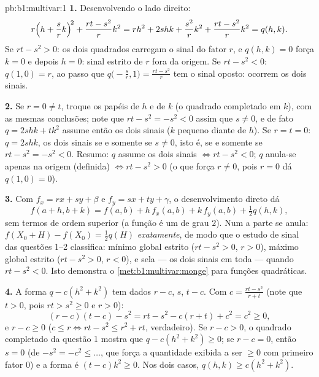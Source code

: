 \begin{solution}{pb:b1:multivar:1}
\textbf{1.} Desenvolvendo o lado direito:
\[
r\Bigl(h + \frac srk\Bigr)^{\!2} + \frac{rt - s^2}{r}k^2
= rh^2 + 2shk + \frac{s^2}{r}k^2 + \frac{rt - s^2}{r}k^2
= q(h,k) .
\]
Se $rt - s^2 > 0$: os dois quadrados carregam o sinal do fator $r$, e $q(h,k) = 0$
força $k = 0$ e depois $h = 0$: sinal estrito de $r$ fora da origem.
Se $rt - s^2 < 0$: $q(1, 0) = r$, ao passo que $q\bigl(-\frac sr, 1\bigr) = \frac{rt - s^2}{r}$ tem o sinal oposto: ocorrem os
dois sinais.

\textbf{2.} Se $r = 0 \neq t$, troque os papéis de $h$ e de $k$ (o quadrado
completado em $k$), com as mesmas conclusões; note que $rt - s^2 = -s^2 < 0$ assim
que $s \neq 0$, e de fato $q =
2shk + tk^2$ assume então os dois sinais ($k$ pequeno
diante de $h$). Se $r = t = 0$: $q = 2shk$, os dois sinais se e somente se
$s \neq 0$, isto é, se e somente se $rt - s^2 = -s^2 < 0$. Resumo: $q$ assume os dois
sinais $\iff rt -
s^2 < 0$; $q$ anula-se apenas na origem (definida) $\iff rt -
s^2 > 0$ (o que
força $r \neq 0$, pois $r = 0$ dá $q(1,0) =
0$).

\textbf{3.} Com $f_x = rx + sy + \beta$ e $f_y = sx + ty +
\gamma$, o desenvolvimento direto dá
\[
f(a + h, b + k) = f(a, b) + h\,f_x(a,b) + k\,f_y(a,b)
+ \tfrac12 q(h, k),
\]
sem termos de ordem superior (a função é um  de grau $2$).
Num  a parte  se anula: $f(X_0 + H)
- f(X_0) = \frac12 q(H)$ \emph{exatamente},
de modo que o estudo de sinal das questões 1--2 classifica: mínimo
global estrito ($rt - s^2 >
0$, $r > 0$), máximo global estrito ($rt - s^2 > 0$,
$r < 0$), e sela --- os dois sinais em toda  --- quando
$rt - s^2 <
0$. Isto demonstra o \cref{met:b1:multivar:monge} para funções quadráticas.

\textbf{4.} A forma $q - c(h^2 + k^2)$ tem dados $r - c$, $s$, $t - c$. Com $c = \frac{rt - s^2}{r + t}$
(note que $t > 0$, pois $rt > s^2 \geq 0$ e $r > 0$):
\[
(r - c)(t - c) - s^2 = rt - s^2 - c(r + t) + c^2 = c^2 \geq 0,
\]
e $r - c \geq 0$ ($c \leq r \iff rt - s^2 \leq r^2 + rt$, verdadeiro). Se $r - c > 0$, o quadrado completado da
questão 1 mostra que $q - c(h^2 + k^2) \geq 0$; se $r - c = 0$, então $s = 0$ (de $-s^2 = -c^2 \leq \dots$, que
força a quantidade exibida a ser $\geq 0$ com primeiro fator $0$) e a
forma é $(t - c)k^2 \geq
0$. Nos dois casos, $q(h,k) \geq c(h^2 + k^2)$.


\end{solution}
